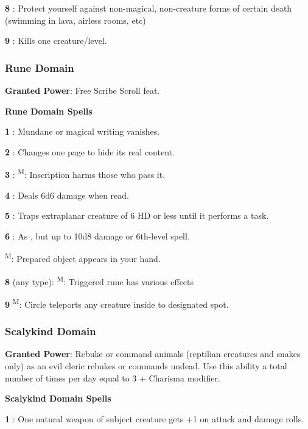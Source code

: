 \textbf{8} : Protect yourself against non-magical, non-creature forms of certain death (swimming in lava, airless rooms, etc)

\textbf{9} : Kills one creature/level.

\subsubsection{Rune Domain}

\textbf{Granted Power}: Free Scribe Scroll feat.

\textbf{Rune Domain Spells}

\textbf{1} : Mundane or magical writing vanishes.

\textbf{2} : Changes one page to hide its real content.

\textbf{3} : \textsuperscript{M}: Inscription harms those who pass it.

\textbf{4} : Deals 6d6 damage when read.

\textbf{5} : Traps extraplanar creature of 6 HD or less until it performs a task.

\textbf{6} : As , but up to 10d8 damage or 6th-level spell.

\textsuperscript{M}: Prepared object appears in your hand.

\textbf{8}  (any type): \textsuperscript{M}: Triggered rune has various effects

\textbf{9} \textsuperscript{M}: Circle teleports any creature inside to designated spot.

\subsubsection{Scalykind Domain}

\textbf{Granted Power}: Rebuke or command animals (reptilian creatures and snakes only) as an evil cleric rebukes or commands undead. Use this ability a total number of times per day equal to 3 + Charisma modifier.

\textbf{Scalykind Domain Spells}

\textbf{1} : One natural weapon of subject creature gets +1 on attack and damage rolls.

